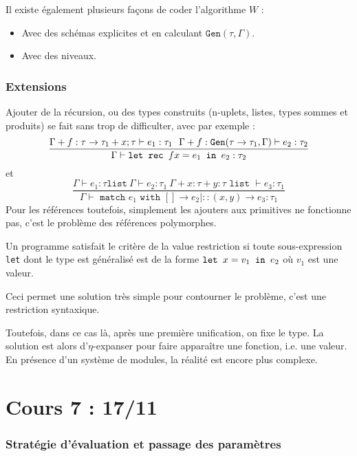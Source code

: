 \documentclass{cours}
\begin{document}
Il existe également plusieurs façons de coder l'algorithme $W$ : 
\begin{itemize}
    \item Avec des schémas explicites et en calculant $\texttt{Gen}(\tau, \Gamma)$.
    \item Avec des niveaux.
\end{itemize}

\section{Extensions}
Ajouter de la récursion, ou des types construits (n-uplets, listes, types sommes et produits) se fait sans trop de difficulter, avec par exemple : 
\[
    \frac{\Gamma + f : \tau \rightarrow \tau_{1} + x ; \tau \vdash e_{1} : \tau_{1} \ \ \Gamma + f : \texttt{Gen}(\tau \rightarrow \tau_{1}, \Gamma) \vdash e_{2} : \tau_{2}}{\Gamma \vdash \texttt{let } \texttt{rec } f x = e_{1} \texttt{ in } e_{2} : \tau_{2}}
\]
et 
\[
    \frac{\Gamma \vdash e_{1} : \tau \texttt{list} \ \Gamma \vdash e_{2} : \tau_{1} \ \Gamma + x : \tau + y : \tau \texttt{ list } \vdash e_{3} : \tau_{1}}{\Gamma \vdash \texttt{ match } e_{1} \texttt{ with } \left[\right] \rightarrow e_{2} \mid ::(x, y) \rightarrow e_{3} : \tau_{1}}
\]
Pour les références toutefois, simplement les ajouters aux primitives ne fonctionne pas, c'est le problème des références polymorphes.

\begin{definition}
    Un programme satisfait le critère de la value restriction si toute sous-expression \texttt{let} dont le type est généralisé est de la forme $\texttt{let } x = v_{1} \texttt{ in } e_{2}$ où $v_{1}$ est une valeur.
\end{definition}
Ceci permet une solution très simple pour contourner le problème, c'est une restriction syntaxique.

Toutefois, dans ce cas là, après une première unification, on fixe le type. La solution est alors d'$\eta$-expanser pour faire apparaître une fonction, i.e. une valeur. En présence d'un système de modules, la réalité est encore plus complexe.


\part[Mode de Passage des Paramètres]{Cours 7 : 17/11}
\section{Stratégie d'évaluation et passage des paramètres}
\end{document}
